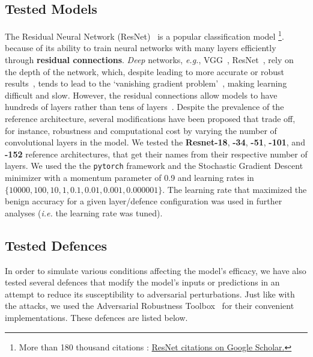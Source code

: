 \subsection{Tested Models}
\label{models}
The Residual Neural Network (ResNet)~\citep{resnet} is a popular classification model \footnote{More than 180 thousand citations : \href{https://scholar.google.com/scholar?cites=9281510746729853742}{ResNet citations on Google Scholar.}}. because of its ability to train neural networks with many layers efficiently through \textbf{residual connections}.
\textit{Deep} networks, \textit{e.g.}, VGG~\citep{vgg}, ResNet~\citep{resnet}, rely on the depth of the network, which, despite leading to more accurate or robust results~\citep{rolnick2017power, carlini_towards_2017}, tends to lead to the `vanishing gradient problem'~\citep{hochreiter1998vanishing}, making learning difficult and slow. However, the residual connections allow models to have hundreds of layers rather than tens of layers~\citep{resnet,vgg}. Despite the prevalence of the reference architecture, several modifications have been proposed that trade off, for instance, robustness and computational cost by varying the number of convolutional layers in the model. We tested the \textbf{Resnet-18}, \textbf{-34}, \textbf{-51}, \textbf{-101}, and \textbf{-152} reference architectures, that get their names from their respective number of layers. We used the the \texttt{pytorch} framework and the Stochastic Gradient Descent minimizer with a momentum parameter of 0.9 and learning rates in $\{10000, 100, 10, 1, 0.1, 0.01, 0.001, 0.000001\}$. The learning rate that maximized the benign accuracy for a given layer/defence configuration was used in further analyses (\textit{i.e.} the learning rate was tuned).

\subsection{Tested Defences}
\label{defences}
In order to simulate various conditions affecting the model's efficacy, we have also tested several defences that modify the model's inputs or predictions in an attempt to reduce its susceptibility to adversarial perturbations. Just like with the attacks, we used the Adversarial Robustness Toolbox~\citep{art2018} for their convenient implementations. These defences are listed below.

